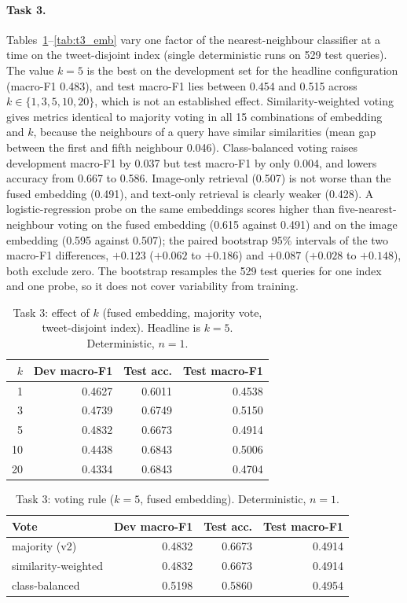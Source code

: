 \paragraph{Task 3.}
Tables~\ref{tab:t3_k}--\ref{tab:t3_emb} vary one factor of the nearest-neighbour classifier at a time on the tweet-disjoint index (single deterministic runs on 529 test queries).
The value $k=5$ is the best on the development set for the headline configuration (macro-F1 0.483), and test macro-F1 lies between 0.454 and 0.515 across $k \in \{1, 3, 5, 10, 20\}$, which is not an established effect.
Similarity-weighted voting gives metrics identical to majority voting in all 15 combinations of embedding and $k$, because the neighbours of a query have similar similarities (mean gap between the first and fifth neighbour 0.046).
Class-balanced voting raises development macro-F1 by 0.037 but test macro-F1 by only 0.004, and lowers accuracy from 0.667 to 0.586.
Image-only retrieval (0.507) is not worse than the fused embedding (0.491), and text-only retrieval is clearly weaker (0.428).
A logistic-regression probe on the same embeddings scores higher than five-nearest-neighbour voting on the fused embedding (0.615 against 0.491) and on the image embedding (0.595 against 0.507); the paired bootstrap 95\% intervals of the two macro-F1 differences, $+0.123$ ($+0.062$ to $+0.186$) and $+0.087$ ($+0.028$ to $+0.148$), both exclude zero.
The bootstrap resamples the 529 test queries for one index and one probe, so it does not cover variability from training.

\begin{table}[t]
\centering
\footnotesize
\caption{Task 3: effect of $k$ (fused embedding, majority vote, tweet-disjoint index). Headline is $k=5$. Deterministic, $n=1$.}
\label{tab:t3_k}
\begin{tabular}{rrrr}
\toprule
$k$ & Dev macro-F1 & Test acc. & Test macro-F1 \\
\midrule
1 & 0.4627 & 0.6011 & 0.4538 \\
3 & 0.4739 & 0.6749 & 0.5150 \\
5 & 0.4832 & 0.6673 & 0.4914 \\
10 & 0.4438 & 0.6843 & 0.5006 \\
20 & 0.4334 & 0.6843 & 0.4704 \\
\bottomrule
\end{tabular}
\end{table}


\begin{table}[t]
\centering
\footnotesize
\caption{Task 3: voting rule ($k=5$, fused embedding). Deterministic, $n=1$.}
\label{tab:t3_vote}
\begin{tabular}{lrrr}
\toprule
Vote & Dev macro-F1 & Test acc. & Test macro-F1 \\
\midrule
majority (v2) & 0.4832 & 0.6673 & 0.4914 \\
similarity-weighted & 0.4832 & 0.6673 & 0.4914 \\
class-balanced & 0.5198 & 0.5860 & 0.4954 \\
\bottomrule
\end{tabular}
\end{table}


